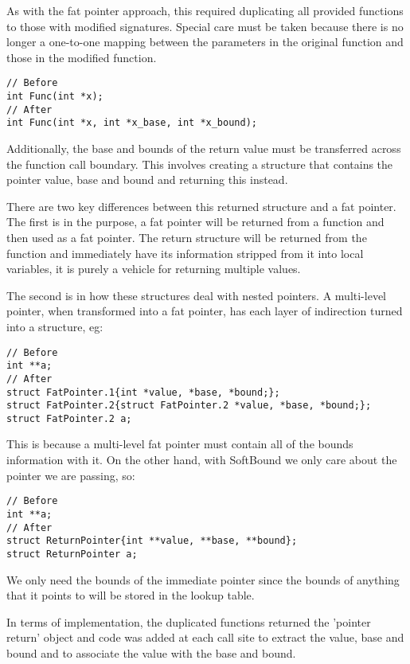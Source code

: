 As with the fat pointer approach, this required duplicating all provided functions to those with modified signatures.
Special care must be taken because there is no longer a one-to-one mapping between the parameters in the original function and those in the modified function.

\begin{verbatim}
// Before
int Func(int *x);
// After
int Func(int *x, int *x_base, int *x_bound);
\end{verbatim}

Additionally, the base and bounds of the return value must be transferred across the function call boundary.
This involves creating a structure that contains the pointer value, base and bound and returning this instead.

There are two key differences between this returned structure and a fat pointer.
The first is in the purpose, a fat pointer will be returned from a function and then used as a fat pointer.
The return structure will be returned from the function and immediately have its information stripped from it into local variables, it is purely a vehicle for returning multiple values.

The second is in how these structures deal with nested pointers.
A multi-level pointer, when transformed into a fat pointer, has each layer of indirection turned into a structure, eg:

\begin{verbatim}
// Before
int **a;
// After
struct FatPointer.1{int *value, *base, *bound;};
struct FatPointer.2{struct FatPointer.2 *value, *base, *bound;};
struct FatPointer.2 a;
\end{verbatim}

This is because a multi-level fat pointer must contain all of the bounds information with it.
On the other hand, with SoftBound we only care about the pointer we are passing, so:

\begin{verbatim}
// Before
int **a;
// After
struct ReturnPointer{int **value, **base, **bound};
struct ReturnPointer a;
\end{verbatim}

We only need the bounds of the immediate pointer since the bounds of anything that it points to will be stored in the lookup table.

In terms of implementation, the duplicated functions returned the 'pointer return' object and code was added at each call site to extract the value, base and bound and to associate the value with the base and bound.

